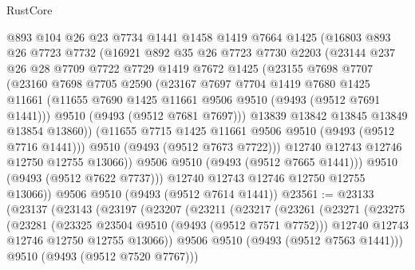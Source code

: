 \begin{lexlean}{RustCore}
\begin{coremodule}
            @893
            @104
            @26
            @23
            @7734
            @1441
            @1458
            @1419
            @7664
            @1425
            (@16803
              @893
              @26
              @7723
              @7732
              (@16921
                @892
                @35
                @26
                @7723
                @7730
                @2203
                (@23144
                  @237
                  @26
                  @28
                  @7709
                  @7722
                  @7729
                  @1419
                  @7672
                  @1425
                  (@23155
                    @7698
                    @7707
                    (@23160
                      @7698
                      @7705
                      @2590
                      (@23167
                        @7697
                        @7704
                        @1419
                        @7680
                        @1425
                        @11661
                        (@11655 @7690 @1425 @11661 @9506 @9510 (@9493 (@9512 @7691 @1441)))
                        @9510
                        (@9493 (@9512 @7681 @7697)))
                      @13839
                      @13842
                      @13845
                      @13849
                      @13854
                      @13860))
                  (@11655 @7715 @1425 @11661 @9506 @9510 (@9493 (@9512 @7716 @1441)))
                  @9510
                  (@9493 (@9512 @7673 @7722)))
                @12740
                @12743
                @12746
                @12750
                @12755
                @13066))
            @9506
            @9510
            (@9493 (@9512 @7665 @1441)))
          @9510
          (@9493 (@9512 @7622 @7737)))
        @12740
        @12743
        @12746
        @12750
        @12755
        @13066))
    @9506
    @9510
    (@9493 (@9512 @7614 @1441))
@23561 := @23133
    (@23137
      (@23143
        (@23197
          (@23207
            (@23211
              (@23217
                (@23261
                  (@23271
                    (@23275
                      (@23281
                        (@23325 @23504 @9510 (@9493 (@9512 @7571 @7752)))
                        @12740
                        @12743
                        @12746
                        @12750
                        @12755
                        @13066))
                    @9506
                    @9510
                    (@9493 (@9512 @7563 @1441)))
                  @9510
                  (@9493 (@9512 @7520 @7767)))

\end{coremodule}
\end{lexlean}
